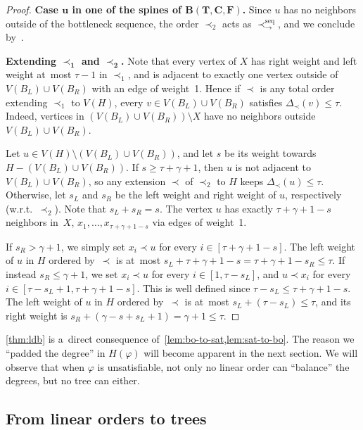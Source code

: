 \documentclass[a4paper,UKenglish,cleveref,hyperref,autoref]{lipics-v2021}
\begin{document}
\begin{proof}
\medskip

\textbf{Case $\bm{u}$ in one of the spines of $\bm{B(T, C, F)}$.}
Since $u$ has no neighbors outside of the bottleneck sequence, the order $\prec_2$ acts as $\prec_\rightarrow^{\text{seq}}$, and we conclude by~.

\medskip

\textbf{Extending $\bm{\prec_1}$ and $\bm{\prec_2}$.}
Note that every vertex of $X$ has right weight and left weight at~most $\tau - 1$ in $\prec_1$, and is adjacent to exactly one vertex outside of $V(B_L) \cup V(B_R)$ with an edge of weight~1.
Hence if $\prec$ is any total order extending $\prec_1$ to $V(H)$, every $v \in V(B_L) \cup V(B_R)$ satisfies $\Delta_\prec(v) \leqslant \tau$.
Indeed, vertices in $ (V(B_L) \cup V(B_R)) \setminus X$ have no neighbors outside $V(B_L) \cup V(B_R)$.

Let $u \in V(H) \setminus (V(B_L) \cup V(B_R))$, and let $s$ be its weight towards $H - (V(B_L) \cup V(B_R))$.
If $s \geqslant \tau + \gamma + 1$, then $u$ is not adjacent to $V(B_L) \cup V(B_R)$, so any extension $\prec$ of $\prec_2$ to $H$ keeps $\Delta_\prec(u) \leqslant \tau$.
Otherwise, let $s_L$ and $s_R$ be the left weight and right weight of $u$, respectively (w.r.t.~$\prec_2$).
Note that $s_L + s_R = s$.
The vertex $u$ has exactly $\tau + \gamma + 1 - s$ neighbors in~$X$, $x_1, \ldots, x_{\tau + \gamma + 1 - s}$ via edges of weight~1.

If $s_R > \gamma+1$, we simply set $x_i \prec u$ for every $i \in [\tau + \gamma + 1 - s]$.
The left weight of $u$ in $H$ ordered by~$\prec$ is at~most $s_L+\tau + \gamma + 1 - s = \tau + \gamma + 1 - s_R \leqslant \tau$.
If instead $s_R \leqslant \gamma+1$, we set $x_i \prec u$ for every $i \in [1,\tau - s_L]$, and $u \prec x_i$ for every $i \in [\tau - s_L + 1,\tau + \gamma + 1 - s]$.
This is well defined since $\tau-s_L \leqslant \tau+\gamma+1-s$.
The left weight of $u$ in $H$ ordered by~$\prec$ is at~most $s_L + (\tau - s_L) \leqslant \tau$, and its right weight is
$s_R + (\gamma - s + s_L + 1) =  \gamma + 1 \leqslant \tau$.
\end{proof}

\cref{thm:ldb} is a~direct consequence of~\cref{lem:bo-to-sat,lem:sat-to-bo}.
The reason we ``padded the degree'' in $H(\varphi)$ will become apparent in the next section.
We will observe that when $\varphi$ is unsatisfiable, not only no linear order can ``balance'' the degrees, but no tree can either.

\subsection{From linear orders to trees}\label{sec:lin-ord-to-trees}
\end{document}
